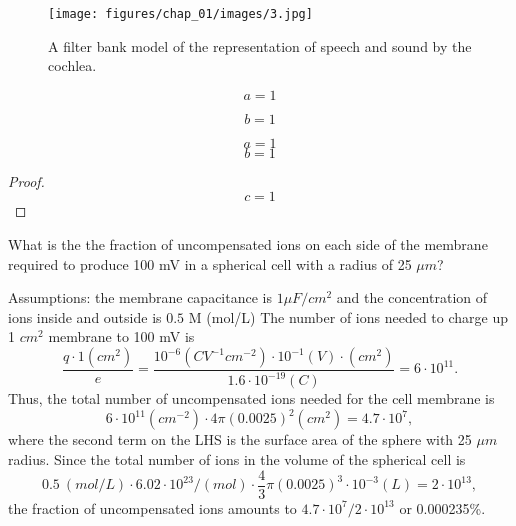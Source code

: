 \begin{figure}[h]
    \center
    \texttt{[image: figures/chap\_01/images/3.jpg]}
    \caption{A filter bank model of the representation of speech and sound by the cochlea.}
    \label{fig:cochleam}
\end{figure}

\begin{equation}
    a=1
\label{eq:1}
\end{equation}

$$b=1$$

\begin{theorem}[Name 1]
    \begin{example}[Name 2]
        \begin{equation}
            a=1
        \label{eq:1}
        \end{equation}
        \[
            b = 1
        \]
    \end{example}

    \begin{proof}
        \[
            c = 1
        \]
    \end{proof}
\end{theorem}

%
%

\begin{example}

    \noindent
    What is the the fraction of uncompensated ions on each side of the
    membrane required to produce 100 mV in a spherical cell with
    a radius of 25 $\mu m$?

    Assumptions: the membrane capacitance is $1 \mu F/cm^2$ and the concentration of ions inside and outside is $0.5$ M (mol/L)
    The number of ions needed to charge up 1 $cm^2$ membrane
    to 100 mV is
    \[
    \frac{q \cdot 1 (cm^2)}{e} = \frac{10^{-6}(C V^{-1} cm^{-2}) \cdot
    10^{-1} (V) \cdot (cm^2)}{1.6 \cdot 10^{-19}(C)} = 6 \cdot 10^{11} .
    \]
    Thus, the total number of uncompensated ions needed for the
    cell membrane is
    \[
    6 \cdot 10^{11} (cm^{-2}) \cdot 4 \pi (0.0025)^2 (cm^2) =
    4.7 \cdot 10^7 ,
    \]
    where the second term on the LHS is the surface area of the sphere
    with 25 $\mu m$ radius.
    Since the total number of ions in the volume of the spherical cell is
    \[
    0.5 ~(mol/L) \cdot 6.02 \cdot 10^{23} / (mol)
    \cdot \frac{4}{3} \pi (0.0025)^3 \cdot 10^{-3} (L) = 2\cdot 10^{13},
    \]
    the fraction of uncompensated ions amounts to
    $4.7 \cdot 10^7 / 2 \cdot 10^{13}$ or 0.000235\%.
\end{example}


